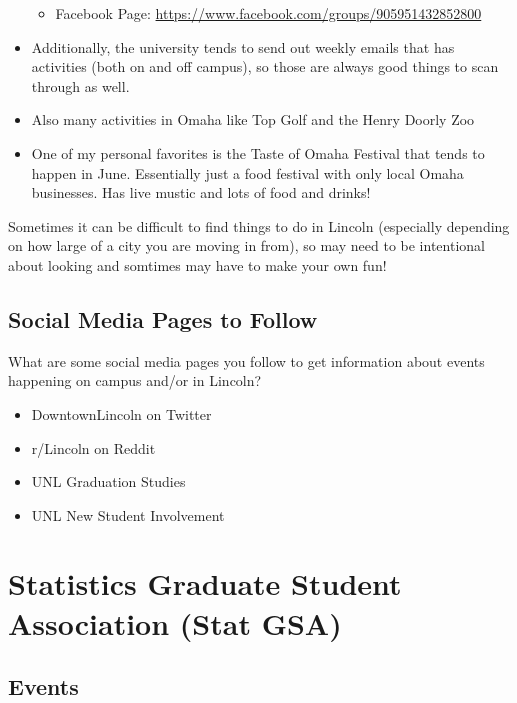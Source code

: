 \documentclass[
  12pt,
]{book}
\providecommand{\tightlist}{%
  \setlength{\itemsep}{0pt}\setlength{\parskip}{0pt}}
\begin{document}
\begin{itemize}
  \begin{itemize}
  \tightlist
  \item
    Facebook Page: \url{https://www.facebook.com/groups/905951432852800}
  \end{itemize}
\item
  Additionally, the university tends to send out weekly emails that has activities (both on and off campus), so those are always good things to scan through as well.
\item
  Also many activities in Omaha like Top Golf and the Henry Doorly Zoo
\item
  One of my personal favorites is the Taste of Omaha Festival that tends to happen in June. Essentially just a food festival with only local Omaha businesses. Has live mustic and lots of food and drinks!
\end{itemize}

Sometimes it can be difficult to find things to do in Lincoln (especially depending on how large of a city you are moving in from), so may need to be intentional about looking and somtimes may have to make your own fun!

\hypertarget{social-media-pages-to-follow}{%
\section{Social Media Pages to Follow}\label{social-media-pages-to-follow}}

What are some social media pages you follow to get information about events happening on campus and/or in Lincoln?

\begin{itemize}
\tightlist
\item
  DowntownLincoln on Twitter
\item
  r/Lincoln on Reddit
\item
  UNL Graduation Studies
\item
  UNL New Student Involvement
\end{itemize}

\hypertarget{statGSA}{%
\chapter{Statistics Graduate Student Association (Stat GSA)}\label{statGSA}}

\hypertarget{events}{%
\section{Events}\label{events}}
\end{document}
